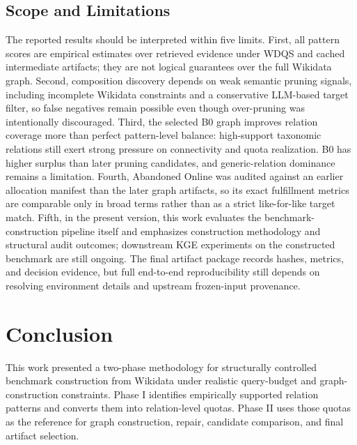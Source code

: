 \documentclass[12pt,a4paper]{article}
\begin{document}
\subsection{Scope and Limitations}

The reported results should be interpreted within five limits. First, all pattern scores are empirical estimates over retrieved evidence under WDQS and cached intermediate artifacts; they are not logical guarantees over the full Wikidata graph. Second, composition discovery depends on weak semantic pruning signals, including incomplete Wikidata constraints and a conservative LLM-based target filter, so false negatives remain possible even though over-pruning was intentionally discouraged. Third, the selected B0 graph improves relation coverage more than perfect pattern-level balance: high-support taxonomic relations still exert strong pressure on connectivity and quota realization. B0 has higher surplus than later pruning candidates, and generic-relation dominance remains a limitation. Fourth, Abandoned Online was audited against an earlier allocation manifest than the later graph artifacts, so its exact fulfillment metrics are comparable only in broad terms rather than as a strict like-for-like target match. Fifth, in the present version, this work evaluates the benchmark-construction pipeline itself and emphasizes construction methodology and structural audit outcomes; downstream KGE experiments on the constructed benchmark are still ongoing. The final artifact package records hashes, metrics, and decision evidence, but full end-to-end reproducibility still depends on resolving environment details and upstream frozen-input provenance.

\section{Conclusion}
\label{sec:conclusion}

This work presented a two-phase methodology for structurally controlled benchmark construction from Wikidata under realistic query-budget and graph-construction constraints. Phase I identifies empirically supported relation patterns and converts them into relation-level quotas. Phase II uses those quotas as the reference for graph construction, repair, candidate comparison, and final artifact selection.
\end{document}
